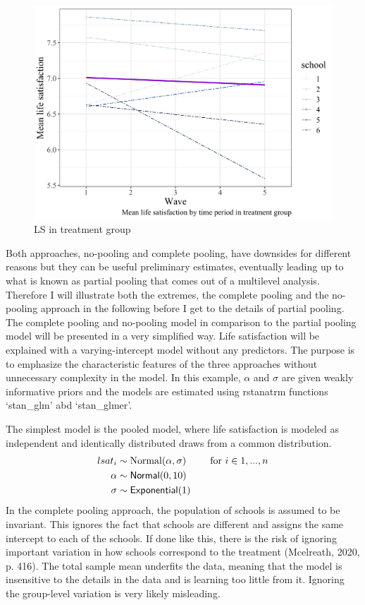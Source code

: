 \documentclass[a4, 12pt]{article}
\begin{document}
\begin{figure}[H]

{\centering \includegraphics[width=0.8\linewidth,]{../figures/lsat_vs_time_by_school_treated} 

}

\caption{LS in treatment group}\label{fig:lsat-vs-time}
\end{figure}

Both approaches, no-pooling and complete pooling, have downsides for different reasons but they can be useful preliminary estimates, eventually leading up to what is known as partial pooling that comes out of a multilevel analysis. Therefore I will illustrate both the extremes, the complete pooling and the no-pooling approach in the following before I get to the details of partial pooling. The complete pooling and no-pooling model in comparison to the partial pooling model will be presented in a very simplified way. Life satisfaction will be explained with a varying-intercept model without any predictors. The purpose is to emphasize the characteristic features of the three approaches without unnecessary complexity in the model. In this example, \(\alpha\) and \(\sigma\) are given weakly informative priors and the models are estimated using rstanatrm functions `stan\_glm' abd `stan\_glmer'.

The simplest model is the pooled model, where life satisfaction is modeled as independent and identically distributed draws from a common distribution.
\begin{align*}
lsat_i & \sim {\mathrm {Normal}} (\alpha, \sigma) & \quad \text{for } i \in 1,...,n \\
\alpha & \sim {\sf Normal} (0, 10) \\
\sigma & \sim {\sf Exponential} (1)
\end{align*}
In the complete pooling approach, the population of schools is assumed to be invariant. This ignores the fact that schools are different and assigns the same intercept to each of the schools. If done like this, there is the risk of ignoring important variation in how schools correspond to the treatment (Mcelreath, 2020, p. 416). The total sample mean underfits the data, meaning that the model is insensitive to the details in the data and is learning too little from it. Ignoring the group-level variation is very likely misleading.
\end{document}

